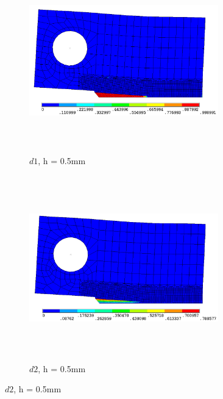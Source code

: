 \documentclass[12pt,a4paper,twoside,openright]{report}
\begin{document}
\begin{figure}[htbp!]\ContinuedFloat 
     \begin{subfigure}{0.4\textwidth}
         \includegraphics[width=8.2cm,height=8cm,keepaspectratio]{26.d1-0.5.png}
         \caption{$d1$, h = 0.5mm}
         \label{fig:d1-0.5}
     \end{subfigure}   
     \hspace{2cm}
     \begin{subfigure}{0.4\textwidth}
         \includegraphics[width=8.2cm,height=8cm,keepaspectratio]{26.d2-0.5.png}
         \caption{$d2$, h = 0.5mm}
         \label{fig:d2-0.5}
     \end{subfigure}
\end{figure}
\FloatBarrier
\end{document}
